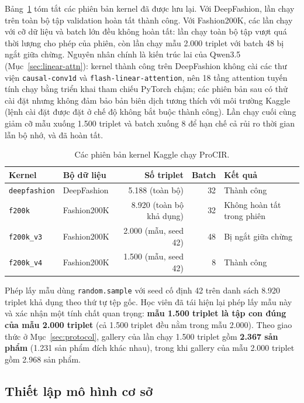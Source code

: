 Bảng~\ref{tab:kaggle-runs} tóm tắt các phiên bản kernel đã được lưu lại. Với DeepFashion, lần chạy trên toàn bộ tập validation hoàn tất thành công. Với Fashion200K, các lần chạy với cỡ dữ liệu và batch lớn đều không hoàn tất: lần chạy toàn bộ tập vượt quá thời lượng cho phép của phiên, còn lần chạy mẫu 2.000 triplet với batch 48 bị ngắt giữa chừng. Nguyên nhân chính là kiến trúc lai của Qwen3.5 (Mục~\ref{sec:linear-attn}): kernel thành công trên DeepFashion không cài các thư viện \texttt{causal-conv1d} và \texttt{flash-linear-attention}, nên 18 tầng attention tuyến tính chạy bằng triển khai tham chiếu PyTorch chậm; các phiên bản sau có thử cài đặt nhưng không đảm bảo bản biên dịch tương thích với môi trường Kaggle (lệnh cài đặt được đặt ở chế độ không bắt buộc thành công). Lần chạy cuối cùng giảm cỡ mẫu xuống 1.500 triplet và batch xuống 8 để hạn chế cả rủi ro thời gian lẫn bộ nhớ, và đã hoàn tất.

\begin{table}[h]
\centering
\caption{Các phiên bản kernel Kaggle chạy ProCIR.}
\label{tab:kaggle-runs}
\small
\begin{tabular}{llrrl}
\toprule
Kernel & Bộ dữ liệu & Số triplet & Batch & Kết quả \\
\midrule
\texttt{deepfashion} & DeepFashion & 5.188 (toàn bộ) & 32 & Thành công \\
\texttt{f200k} & Fashion200K & 8.920 (toàn bộ khả dụng) & 32 & Không hoàn tất trong phiên \\
\texttt{f200k\_v3} & Fashion200K & 2.000 (mẫu, seed 42) & 48 & Bị ngắt giữa chừng \\
\texttt{f200k\_v4} & Fashion200K & 1.500 (mẫu, seed 42) & 8 & Thành công \\
\bottomrule
\end{tabular}
\end{table}

Phép lấy mẫu dùng \texttt{random.sample} với seed cố định 42 trên danh sách 8.920 triplet khả dụng theo thứ tự tệp gốc. Học viên đã tái hiện lại phép lấy mẫu này và xác nhận một tính chất quan trọng: \textbf{mẫu 1.500 triplet là tập con đúng của mẫu 2.000 triplet} (cả 1.500 triplet đều nằm trong mẫu 2.000). Theo giao thức ở Mục~\ref{sec:protocol}, gallery của lần chạy 1.500 triplet gồm \textbf{2.367 sản phẩm} (1.231 sản phẩm đích khác nhau), trong khi gallery của mẫu 2.000 triplet gồm 2.968 sản phẩm.

\subsection{Thiết lập mô hình cơ sở}\label{sec:baseline-setup}

